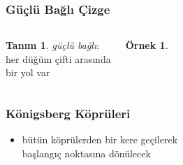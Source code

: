 \documentclass[dvipsnames]{beamer}
\theoremstyle{definition}
\newtheorem{tanim}[theorem]{Tanım}
\theoremstyle{example}
\newtheorem{ornek}[theorem]{Örnek}
\theoremstyle{plain}
\newtheorem{teorem}[theorem]{Teorem}
\begin{document}
\begin{frame}
  \frametitle{Güçlü Bağlı Çizge}

  \begin{columns}
    \begin{tanim}
      \emph{güçlü bağlı}:\\
      her düğüm çifti arasında\\
      bir yol var
    \end{tanim}

    \begin{ornek}
      \begin{center}
      \end{center}
    \end{ornek}
  \end{columns}
\end{frame}
%
%
%
%

\begin{frame}
  \frametitle{Königsberg Köprüleri}

  \begin{center}
  \end{center}

  \begin{itemize}
    \item bütün köprülerden bir kere geçilerek\\
      başlangıç noktasına dönülecek
  \end{itemize}
\end{frame}
\end{document}
